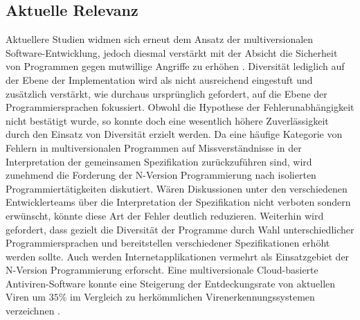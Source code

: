 \subsection{Aktuelle Relevanz}\label{bewertung-relevanz}
Aktuellere Studien widmen sich erneut dem Ansatz der multiversionalen Software-Entwicklung, jedoch diesmal verstärkt mit der Absicht die Sicherheit von Programmen gegen mutwillige Angriffe zu erhöhen \cite{current-challenges}\cite{zero-day}. Diversität lediglich auf der Ebene der Implementation wird als nicht ausreichend eingestuft und zusätzlich verstärkt, wie durchaus ursprünglich gefordert, auf die Ebene der Programmiersprachen fokussiert. Obwohl die Hypothese der Fehlerunabhängigkeit nicht bestätigt wurde, so konnte doch eine wesentlich höhere Zuverlässigkeit durch den Einsatz von Diversität erzielt werden.
Da eine häufige Kategorie von Fehlern in multiversionalen Programmen auf Missverständnisse in der Interpretation der gemeinsamen Spezifikation zurückzuführen sind, wird zunehmend die Forderung der N-Version Programmierung nach isolierten Programmiertätigkeiten diskutiert. Wären Diskussionen unter den verschiedenen Entwicklerteams über die Interpretation der Spezifikation nicht verboten sondern erwünscht, könnte diese Art der Fehler deutlich reduzieren. Weiterhin wird gefordert, dass gezielt die Diversität der Programme durch Wahl unterschiedlicher Programmiersprachen und bereitstellen verschiedener Spezifikationen erhöht werden sollte. 
Auch werden Internetapplikationen vermehrt als Einsatzgebiet der N-Version Programmierung erforscht. Eine multiversionale Cloud-basierte Antiviren-Software konnte eine Steigerung der Entdeckungsrate von aktuellen Viren um $35\%$ im Vergleich zu herkömmlichen Virenerkennungssystemen verzeichnen \cite{Oberheide:2008:CNA:1496711.1496718}.